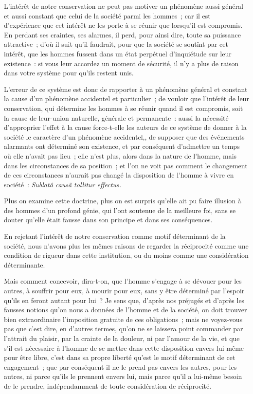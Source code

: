 \documentclass[french,twoside]{book} %
\begin{document}
L’intérêt de notre conservation ne peut pas motiver un phénomène aussi général et aussi constant que celui de la société parmi les hommes ; car il est d’expérience que cet intérêt ne les porte à se réunir que lorsqu’il est compromis. En perdant ses craintes, ses alarmes, il perd, pour ainsi dire, toute sa puissance attractive ; d’où il suit qu’il faudrait, pour que la société se soutînt par cet intérêt, que les hommes fussent dans un état perpétuel d’inquiétude sur leur existence : si vous leur accordez un moment de sécurité, il n’y a plus de raison dans votre système pour qu’ils restent unis.\par
L’erreur de ce système est donc de rapporter à un phénomène général et constant la cause d’un phénomène accidentel et particulier ; de vouloir que l’intérêt de leur conservation, qui détermine les hommes à se réunir quand il est compromis, soit la cause de leur-union naturelle, générale et permanente : aussi la nécessité d’approprier l’effet à la cause force-t-elle les auteurs de ce système de donner à la société le caractère d’un phénomène accidentel,, de supposer que des événements alarmants ont déterminé son existence, et par conséquent d’admettre un temps où elle n’avait pas lieu ; elle n’est plus, alors dans la nature de l’homme, mais dans les circonstances de sa position ; et l’on ne voit pas comment le changement de ces circonstances n’aurait pas changé la disposition de l’homme à vivre en société : {\itshape Sublatâ causâ tollitur effectus.}\par
Plus on examine cette doctrine, plus on est surpris qu’elle ait pu faire illusion à des hommes d’un profond génie, qui l’ont soutenue de la meilleure foi, sans se douter qu’elle était fausse dans son principe et dans ses conséquences.\par
En rejetant l’intérêt de notre conservation comme motif déterminant de la société, nous n’avons plus les mêmes raisons de regarder la réciprocité comme une condition de rigueur dans cette institution, ou du moins comme une considération déterminante.\par
Mais comment concevoir, dira-t-on, que l’homme s’engage à se dévouer pour les autres, à souffrir pour eux, à mourir pour eux, sans y être déterminé par l’espoir qu’ils en feront autant pour lui ? Je sens que, d’après nos préjugés et d’après les fausses notions qu’on nous a données de l’homme et de la société, on doit trouver bien extraordinaire l’imposition gratuite de ces obligations ; mais ne voyez-vous pas que c’est dire, en d’autres termes, qu’on ne se laissera point commander par l’attrait du plaisir, par la crainte de la douleur, ni par l’amour de la vie, et que s’il est nécessaire à l’homme de se mettre dans cette disposition envers lui-même pour être libre, c’est dans sa propre liberté qu’est le motif déterminant de cet engagement ; que par conséquent il ne le prend pas envers les autres, pour les autres, ni parce qu’ils le prennent envers lui, mais parce qu’il a lui-même besoin de le prendre, indépendamment de toute considération de réciprocité.\par
\end{document}

